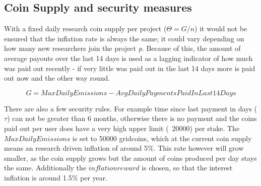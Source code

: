 \subsection{Coin Supply and security measures}

With a fixed daily research coin supply per project ($\Theta = G/n$) it would not be ensured that the inflation rate is always the same; it could vary depending on how many new researchers join the project \textit{p}. Because of this, the amount of average payouts over the last 14 days is used as a lagging indicator of how much was paid out recently - if very little was paid out in the last 14 days more is paid out now and the other way round.

\[ G = MaxDailyEmissions - AvgDailyPaymentsPaidInLast14Days \]

There are also a few security rules. For example time since last payment in days ($\tau$) can not be greater than 6 months, otherwise there is no payment and the coins paid out per user does have a very high upper limit (~20000) per stake.
The $MaxDailyEmissions$ is set to 50000 gridcoins, which at the current coin supply means an research driven inflation of around 5\%. This rate however will grow smaller, as the coin supply grows but the amount of coins produced per day stays the same. Additionally the $inflationreward$ is chosen, so that the interest inflation is around 1.5\% per year.
